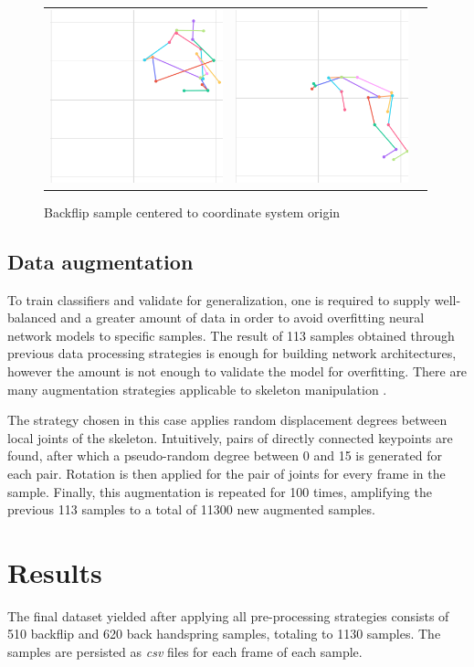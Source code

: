 \begin{figure}
\begin{tabular}{ccc}
\includegraphics[width=5cm]{images/data-preprocessing/centered-backflip-skel-part-5}&
\includegraphics[width=5cm]{images/data-preprocessing/centered-backflip-skel-part-6}\\
\end{tabular}
    \caption{Backflip sample centered to coordinate system origin}
    \label{centered-backflip-4-rasmus}
\end{figure}

\subsection{Data augmentation}

To train classifiers and validate for generalization, one is required to supply well-balanced and a greater amount of data in order to avoid overfitting neural network models to specific samples. The result of 113 samples obtained through previous data processing strategies is enough for building network architectures, however the amount is not enough to validate the model for overfitting. There are many augmentation strategies applicable to skeleton manipulation \cite{NUNEZ201880}. 

The strategy chosen in this case applies random displacement degrees between local joints of the skeleton. Intuitively, pairs of directly connected keypoints are found, after which a pseudo-random degree between 0 and 15 is generated for each pair. Rotation is then applied for the pair of joints for every frame in the sample. Finally, this augmentation is repeated for 100 times, amplifying the previous 113 samples to a total of 11300 new augmented samples.

\section{Results}
\label{pre-processing-results}

The final dataset yielded after applying all pre-processing strategies consists of 510 backflip and 620 back handspring samples, totaling to 1130 samples. The samples are persisted as \textit{csv} files for each frame of each sample.


